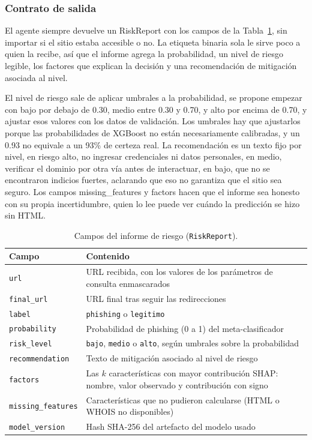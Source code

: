 \subsubsection{Contrato de salida}

El agente siempre devuelve un RiskReport con los campos de la Tabla~\ref{tab:informe}, sin importar si el sitio estaba accesible o no. La etiqueta binaria sola le sirve poco a quien la recibe, así que el informe agrega la probabilidad, un nivel de riesgo legible, los factores que explican la decisión y una recomendación de mitigación asociada al nivel.\newline

El nivel de riesgo sale de aplicar umbrales a la probabilidad, se propone empezar con bajo por debajo de 0.30, medio entre 0.30 y 0.70, y alto por encima de 0.70, y ajustar esos valores con los datos de validación. Los umbrales hay que ajustarlos porque las probabilidades de XGBoost no están necesariamente calibradas, y un 0.93 no equivale a un 93\% de certeza real. La recomendación es un texto fijo por nivel, en riesgo alto, no ingresar credenciales ni datos personales, en medio, verificar el dominio por otra vía antes de interactuar, en bajo, que no se encontraron indicios fuertes, aclarando que eso no garantiza que el sitio sea seguro. Los campos missing\_features y factors hacen que el informe sea honesto con su propia incertidumbre, quien lo lee puede ver cuándo la predicción se hizo sin HTML.\newline

\begin{table}[ht]
\caption{Campos del informe de riesgo (\texttt{RiskReport}).}
\label{tab:informe}
\centering
\footnotesize
\renewcommand{\arraystretch}{1.15}
\begin{tabular}{p{2.4cm} p{5.5cm}}
\hline
\textbf{Campo} & \textbf{Contenido}\\
\hline
\texttt{url} & URL recibida, con los valores de los parámetros de consulta enmascarados\\
\texttt{final\_url} & URL final tras seguir las redirecciones\\
\texttt{label} & \texttt{phishing} o \texttt{legitimo}\\
\texttt{probability} & Probabilidad de phishing (0 a 1) del meta-clasificador\\
\texttt{risk\_level} & \texttt{bajo}, \texttt{medio} o \texttt{alto}, según umbrales sobre la probabilidad\\
\texttt{recommendation} & Texto de mitigación asociado al nivel de riesgo\\
\texttt{factors} & Las $k$ características con mayor contribución SHAP: nombre, valor observado y contribución con signo\\
\texttt{missing\_features} & Características que no pudieron calcularse (HTML o WHOIS no disponibles)\\
\texttt{model\_version} & Hash SHA-256 del artefacto del modelo usado\\
\hline
\end{tabular}
\end{table}


